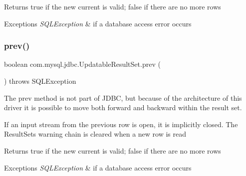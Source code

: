 \begin{DoxyReturn}{Returns}
true if the new current is valid; false if there are no more rows
\end{DoxyReturn}

\begin{DoxyExceptions}{Exceptions}
{\em S\+Q\+L\+Exception} & if a database access error occurs \\
\hline
\end{DoxyExceptions}
\mbox{\label{classcom_1_1mysql_1_1jdbc_1_1_updatable_result_set_a6c5a8bfdbea2d715e45003935e83e9bc}} 
\subsubsection{\texorpdfstring{prev()}{prev()}}
{\footnotesize\ttfamily boolean com.\+mysql.\+jdbc.\+Updatable\+Result\+Set.\+prev (\begin{DoxyParamCaption}{ }\end{DoxyParamCaption}) throws S\+Q\+L\+Exception}

The prev method is not part of J\+D\+BC, but because of the architecture of this driver it is possible to move both forward and backward within the result set.

If an input stream from the previous row is open, it is implicitly closed. The Result\+Set\textquotesingle{}s warning chain is cleared when a new row is read 

\begin{DoxyReturn}{Returns}
true if the new current is valid; false if there are no more rows
\end{DoxyReturn}

\begin{DoxyExceptions}{Exceptions}
{\em S\+Q\+L\+Exception} & if a database access error occurs \\
\hline
\end{DoxyExceptions}
\mbox{\label{classcom_1_1mysql_1_1jdbc_1_1_updatable_result_set_a8e765bdd7ae0094837a347f5f77486ce}} 
